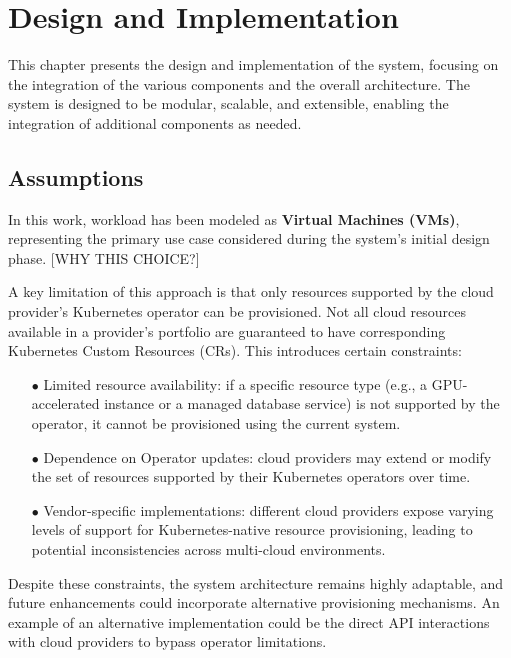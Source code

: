 \chapter{Design and Implementation}
\label{cha:design}

This chapter presents the design and implementation of the system, focusing on the integration of the various components and the overall architecture. The system is designed to be modular, scalable, and extensible, enabling the integration of additional components as needed.

\section{Assumptions}

In this work, workload has been modeled as \textbf{Virtual Machines (VMs)}, representing the primary use case considered during the system's initial design phase. 
[WHY THIS CHOICE?]

A key limitation of this approach is that only resources supported by the cloud provider’s Kubernetes operator can be provisioned. Not all cloud resources available in a provider’s portfolio are guaranteed to have corresponding Kubernetes Custom Resources (CRs). This introduces certain constraints:


\begin{itemize}[itemsep=0.2pt, topsep=1pt]
  \item[$\bullet$] Limited resource availability: if a specific resource type (e.g., a GPU-accelerated instance or a managed database service) is not supported by the operator, it cannot be provisioned using the current system.
  \item[$\bullet$] Dependence on Operator updates: cloud providers may extend or modify the set of resources supported by their Kubernetes operators over time.
  \item[$\bullet$] Vendor-specific implementations: different cloud providers expose varying levels of support for Kubernetes-native resource provisioning, leading to potential inconsistencies across multi-cloud environments.
\end{itemize}

Despite these constraints, the system architecture remains highly adaptable, and future enhancements could incorporate alternative provisioning mechanisms. 
An example of an alternative implementation could be the direct API interactions with cloud providers to bypass operator limitations.

